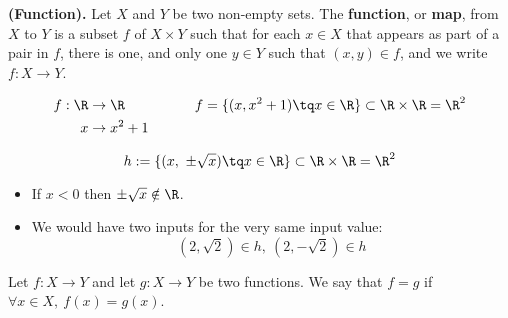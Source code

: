 \begin{definition}
    \textbf{(Function).} Let $X$ and $Y$ be two non-empty sets. The \textbf{function}, or \textbf{map}, from $X$ to $Y$ is a subset $f$ of $X\times Y$ such that for each $x\in X$ that appears as part of a pair in $f$, there is one, and only one $y\in Y$ such that $\left( x, y \right)\in f$, and we write $f:X\to Y$.
\end{definition}
\begin{example}
    \begin{align}
        f:\R&\to\R \quad\quad\quad\quad\quad f = \{( x, x^2 + 1)\tq x\in\R \}\subset\R\times\R = \R^2 \\ 
        x&\to x^2 + 1
    \end{align}
\end{example}
\begin{example}
    \begin{equation}
        h:=\{( x,\ \pm \sqrt{x})\tq x\in\R \}\subset\R\times\R = \R^2 
    \end{equation}
    \begin{itemize}
        \item If $x < 0$ then $\pm\sqrt{x} \notin\R $.
        \item We would have two inputs for the very same input value: 
            \begin{equation}
                (2, \sqrt{2} )\in h,\ ( 2, -\sqrt{2})\in h
            \end{equation}
    \end{itemize}
\end{example}
\begin{definition}
    Let $f:X\to Y$ and let $g:X\to Y$ be two functions. We say that $f = g$ if $\forall x\in X,\ f\left( x \right) = g\left( x \right)$.
\end{definition}

